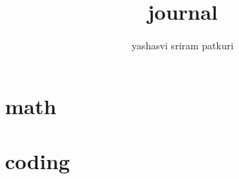 \documentclass[12pt]{report}
\title{journal}
\author{yashasvi sriram patkuri}
\begin{document}
\maketitle


\tableofcontents

\part{math}





% 

\part{coding}

\end{document}
